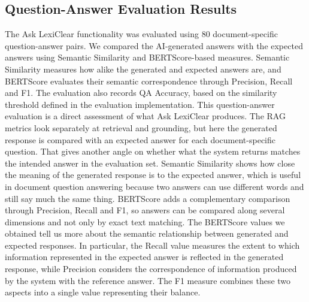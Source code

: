 \documentclass[12pt,a4paper,oneside]{report}
\begin{document}
\subsection{Question-Answer Evaluation Results}

The Ask LexiClear functionality was evaluated using 80 document-specific question-answer pairs. We compared the AI-generated answers with the expected answers using Semantic Similarity and BERTScore-based measures. Semantic Similarity measures how alike the generated and expected answers are, and BERTScore evaluates their semantic correspondence through Precision, Recall and F1. The evaluation also records QA Accuracy, based on the similarity threshold defined in the evaluation implementation. This question-answer evaluation is a direct assessment of what Ask LexiClear produces. The RAG metrics look separately at retrieval and grounding, but here the generated response is compared with an expected answer for each document-specific question. That gives another angle on whether what the system returns matches the intended answer in the evaluation set. Semantic Similarity shows how close the meaning of the generated response is to the expected answer, which is useful in document question answering because two answers can use different words and still say much the same thing. BERTScore adds a complementary comparison through Precision, Recall and F1, so answers can be compared along several dimensions and not only by exact text matching. The BERTScore values we obtained tell us more about the semantic relationship between generated and expected responses. In particular, the Recall value measures the extent to which information represented in the expected answer is reflected in the generated response, while Precision considers the correspondence of information produced by the system with the reference answer. The F1 measure combines these two aspects into a single value representing their balance.
\end{document}
